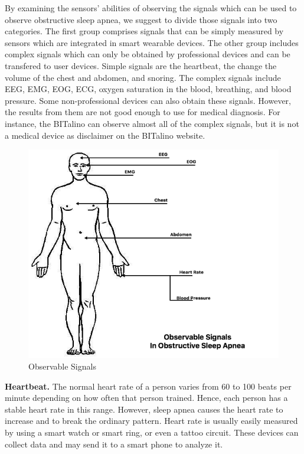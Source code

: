     By examining the sensors' abilities of observing the signals which can be used to observe obstructive sleep apnea, we suggest to divide those signals into two categories. The first group comprises signals that can be simply measured by sensors which are integrated in smart wearable devices. The other group includes complex signals which can only be obtained by professional devices and can be transfered to user devices. Simple signals are the heartbeat, the change the volume of the chest and abdomen, and snoring. The complex signals include EEG, EMG, EOG, ECG, oxygen saturation in the blood, breathing, and blood pressure. Some non-professional devices can also obtain these signals. However, the results from them are not good enough to use for medical diagnosis. For instance, the BITalino can observe almost all of the complex signals, but it is not a medical device as disclaimer on the BITalino website.
    \begin{figure}
        \centering
        \includegraphics[width=1.0\textwidth]{Figures/humanbody.jpg}
        \caption{Observable Signals \citep{Advan}}
        \label{fig:Figures/humanbody}
    \end{figure}
    \textbf{Heartbeat. } The normal heart rate of a person varies from 60 to 100 beats per minute \citep{HEARTORG_HR} depending on how often that person trained. Hence, each person has a stable heart rate in this range. However, sleep apnea causes the heart rate to increase and to break the ordinary pattern. Heart rate is usually easily measured by using a smart watch or smart ring, or even a tattoo circuit. These devices can collect data and may send it to a smart phone to analyze it.

